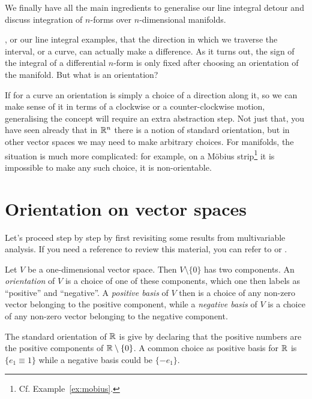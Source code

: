 We finally have all the main ingredients to generalise our line integral detour and discuss integration of $n$-forms over $n$-dimensional manifolds.

, or our line integral examples, that the direction in which we traverse the interval, or a curve, can actually make a difference.
As it turns out, the sign of the integral of a differential $n$-form is only fixed after choosing an orientation of the manifold.
But what is an orientation?

If for a curve an orientation is simply a choice of a direction along it, so we can make sense of it in terms of a clockwise or a counter-clockwise motion, generalising the concept will require an extra abstraction step.
Not just that, you have seen already that in $\mathbb{R}^n$ there is a notion of standard orientation, but in other vector spaces we may need to make arbitrary choices.
For manifolds, the situation is much more complicated: for example, on a M\"obius strip\footnote{Cf. Example~\ref{ex:mobius}.} it is impossible to make any such choice, it is non-orientable.

\section{Orientation on vector spaces}
Let's proceed step by step by first revisiting some results from multivariable analysis. If you need a reference to review this material, you can refer to \cite[Chapter 6.2]{book:abrahammarsdenratiu} or \cite[Chapters 21.1-21.2]{book:tu}.

\begin{definition}
	Let $V$ be a one-dimensional vector space. Then $V\setminus\{0\}$ has two components.
	An \emph{orientation} of $V$ is a choice of one of these components, which one then labels as ``positive'' and ``negative''.
	A \emph{positive basis} of $V$ then is a choice of any non-zero vector belonging to the positive component, while a \emph{negative basis} of $V$ is a choice of any non-zero vector belonging to the negative component.
\end{definition}

\begin{example}
	The standard orientation of $\mathbb{R}$ is give by declaring that the positive numbers are the positive components of $\mathbb{R}\setminus\{0\}$.
	A common choice as positive basis for $\mathbb{R}$ is $\{e_1 \equiv 1\}$ while a negative basis could be $\{-e_1\}$.
\end{example}

